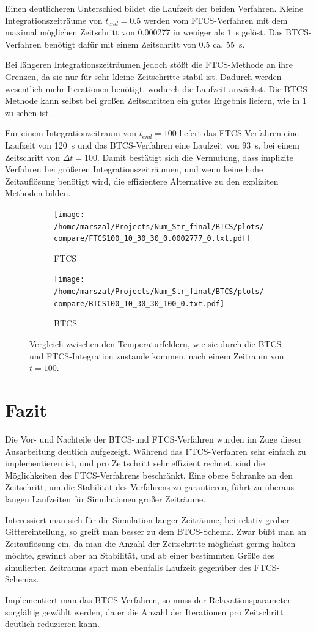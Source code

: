 Einen deutlicheren Unterschied bildet die Laufzeit der beiden Verfahren. Kleine Integrationszeiträume von $t_{end}=0.5$ werden vom FTCS-Verfahren mit dem maximal möglichen Zeitschritt von 0.000277 in weniger als $1$~s gelöst. Das BTCS-Verfahren benötigt dafür mit einem Zeitschritt von 0.5 ca. 55~s.

Bei längeren Integrationszeiträumen jedoch stößt die FTCS-Methode an ihre Grenzen, da sie nur für sehr kleine Zeitschritte stabil ist.
Dadurch werden wesentlich mehr Iterationen benötigt, wodurch die Laufzeit anwächst.
Die BTCS-Methode kann selbst bei großen Zeitschritten ein gutes Ergebnis liefern, wie in \cref{fig:vergleich2} zu sehen ist.

Für einem Integrationzeitraum von $t_{end}=100$ liefert das FTCS-Verfahren eine Laufzeit von 120~s und das BTCS-Verfahren eine Laufzeit von 93~s, bei einem Zeitschritt von $\Delta t = 100$.
Damit bestätigt sich die Vermutung, dass implizite Verfahren bei größeren Integrationszeiträumen, und wenn keine hohe Zeitauflösung benötigt wird, die effizientere Alternative zu den expliziten Methoden bilden.

\begin{figure}
\centering
  \begin{subfigure}[b]{0.5\textwidth}\caption{FTCS}
    \texttt{[image: /home/marszal/Projects/Num\_Str\_final/BTCS/plots/compare/FTCS100\_10\_30\_30\_0.0002777\_0.txt.pdf]}
  \end{subfigure}
  \hspace{-0.5cm}
  \begin{subfigure}[b]{0.5\textwidth}\caption{BTCS}
    \texttt{[image: /home/marszal/Projects/Num\_Str\_final/BTCS/plots/compare/BTCS100\_10\_30\_30\_100\_0.txt.pdf]}
  \end{subfigure}
  \caption{Vergleich zwischen den Temperaturfeldern, wie sie durch die BTCS- und FTCS-Integration zustande kommen, nach einem Zeitraum von $t=100$.}\label{fig:vergleich2}
\end{figure}
\newpage
\section{Fazit}
Die Vor- und Nachteile der BTCS-und FTCS-Verfahren wurden im Zuge dieser Ausarbeitung deutlich aufgezeigt.
Während das FTCS-Verfahren sehr einfach zu implementieren ist, und pro Zeitschritt sehr effizient rechnet, sind die Möglichkeiten des FTCS-Verfahrens beschränkt. Eine obere Schranke an den Zeitschritt, um die Stabilität des Verfahrens zu garantieren, führt zu überaus langen Laufzeiten für Simulationen großer Zeiträume.

Interessiert man sich für die Simulation langer Zeiträume, bei relativ grober Gittereinteilung, so greift man besser zu dem BTCS-Schema.
Zwar büßt man an Zeitauflösung ein, da man die Anzahl der Zeitschritte möglichst gering halten möchte, gewinnt aber an Stabilität, und ab einer bestimmten Größe des simulierten Zeitraums spart man ebenfalls Laufzeit gegenüber des FTCS-Schemas.

Implementiert man das BTCS-Verfahren, so muss der Relaxationsparameter sorgfältig gewählt werden, da er die Anzahl der Iterationen pro Zeitschritt deutlich reduzieren kann.


